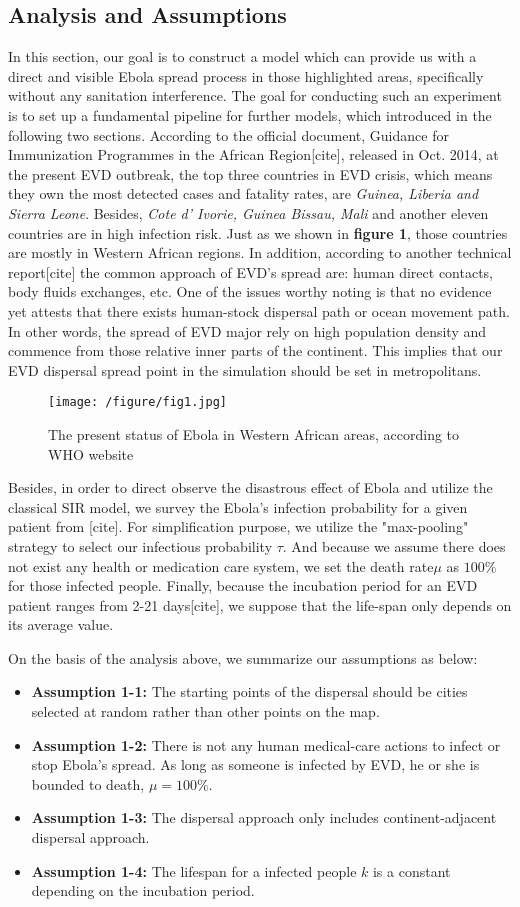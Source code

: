 \subsection{Analysis and Assumptions}
In this section, our goal is to construct a model which can provide us with a direct and visible Ebola spread process in those highlighted areas, specifically without any sanitation interference. The goal for conducting such an experiment is to set up a fundamental pipeline for further models, which introduced in the following two sections. According to the official document, Guidance for Immunization Programmes in the African Region[cite], released in Oct. 2014, at the present EVD outbreak, the top three countries in EVD crisis, which means they own the most detected cases and fatality rates, are \textit{Guinea, Liberia and Sierra Leone}. Besides, \textit{Cote d' Ivorie, Guinea Bissau, Mali} and another eleven countries are in high infection risk. Just as we shown in \textbf{figure 1}, those countries are mostly in Western African regions.
In addition, according to another technical report[cite] the common approach of EVD's spread are: human direct contacts, body fluids exchanges, etc. One of the issues worthy noting is that no evidence yet attests that there exists human-stock dispersal path or ocean movement path. In other words, the spread of EVD major rely on high population density and commence from those relative inner parts of the continent. This implies that our EVD dispersal spread point in the simulation should be set in metropolitans. 
\begin{figure}[htbp]
\centering
\texttt{[image: /figure/fig1.jpg]}
\caption{The present status of Ebola in Western African areas, according to WHO website} \label{fig:1}
\end{figure}
Besides, in order to direct observe the disastrous effect of Ebola and utilize the classical SIR model, we survey the Ebola's infection probability for a given patient from [cite]. For simplification purpose, we utilize the "max-pooling" strategy to select our infectious probability $\tau$. And because we assume there does not exist any health or medication care system, we set the death rate$\mu$ as $100\%$ for those infected people. Finally, because the incubation period for an EVD patient ranges from 2-21 days[cite], we suppose that the life-span only depends on its average value.

On the basis of the analysis above, we summarize our assumptions as below:
\begin{itemize}
\item \textbf{Assumption 1-1:} The starting points of the dispersal should be cities selected at random rather than other points on the map.
\item \textbf{Assumption 1-2:} There is not any human medical-care actions to infect or stop Ebola's spread. As long as someone is infected by EVD, he or she is bounded to death, $\mu=100\%$.
\item\textbf{Assumption 1-3:} The dispersal approach only includes continent-adjacent dispersal approach.
\item\textbf{Assumption 1-4:} The lifespan for a infected people $k$ is a constant depending on the incubation period.
\end{itemize} 

